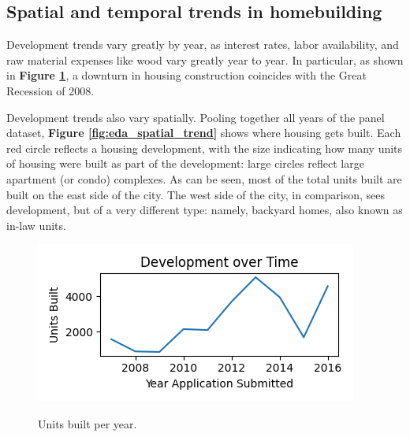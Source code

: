 \documentclass[a4paper,12pt]{article}
\begin{document}
\subsection{Spatial and temporal trends in homebuilding}
Development trends vary greatly by year, as interest rates, labor availability, and raw material expenses like wood vary greatly year to year. In particular, as shown in \textbf{Figure \ref{fig:eda_year_trend}}, a downturn in housing construction coincides with the Great Recession of 2008.

Development trends also vary spatially. Pooling together all years of the panel dataset, \textbf{Figure \ref{fig:eda_spatial_trend}} shows where housing gets built. Each red circle reflects a housing development, with the size indicating how many units of housing were built as part of the development: large circles reflect large apartment (or condo) complexes. As can be seen, most of the total units built are built on the east side of the city. The west side of the city, in comparison, sees development, but of a very different type: namely, backyard homes, also known as in-law units.

\begin{figure}
    \centering
    \caption{Units built per year.}
    \includegraphics[scale=.9]{figures/development_over_time.png}
    \label{fig:eda_year_trend}
\end{figure}
\end{document}
